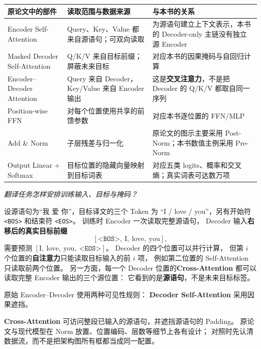 \begin{center}
\small
\renewcommand{\arraystretch}{1.18}
\begin{tabularx}{\linewidth}{@{}>{\raggedright\arraybackslash}p{35mm}>{\raggedright\arraybackslash}p{46mm}>{\raggedright\arraybackslash}X@{}}
\toprule
原论文中的部件 & 读取范围与数据来源 & 与本书的关系\\\midrule
Encoder Self-Attention &
Query、Key、Value 都来自源语句；可双向读取 &
为源语句建立上下文表示，本书的 Decoder-only 主链没有独立源 Encoder\\
Masked Decoder Self-Attention &
Q/K/V 来自目标前缀；屏蔽未来目标 &
对应本书的因果掩码与自回归计算\\
Encoder--Decoder Attention &
Query 来自 Decoder，Key/Value 来自 Encoder 输出 &
这是\textbf{交叉注意力}，不是把 Decoder 的 Q/K/V 都取自同一序列\\
Position-wise FFN &
对每个位置使用共享的前馈参数 &
对应本书逐位置的 FFN/MLP\\
Add \& Norm &
子层残差与归一化 &
原论文的图示主要采用 Post-Norm；本书数值主例采用 Pre-Norm\\
Output Linear + Softmax &
目标位置的隐藏向量映射到目标词表 &
对应五类 logits、概率和交叉熵；真实词表可达数万项\\
\bottomrule
\end{tabularx}
\end{center}

\begin{example}
\noindent\emph{翻译任务怎样安排训练输入、目标与掩码？}\par

设源语句为“我 爱 你”，目标译文的三个 Token 为
“I / love / you”，另有开始符 \texttt{<BOS>} 和结束符 \texttt{<EOS>}。
训练时 Encoder 一次读取完整源语句，
Decoder 输入\textbf{右移后的真实目标前缀}
\[
[\texttt{<BOS>},\ \text{I},\ \text{love},\ \text{you}],
\]
需要预测
$[\text{I},\ \text{love},\ \text{you},\ \texttt{<EOS>}]$。
Decoder 的四个位置可以并行计算，
但第 $i$ 个位置的\textbf{自注意力}只能读取目标输入的前 $i$ 项，
例如第二位置的 Self-Attention 只读取前两个位置。
另一方面，每一个 Decoder 位置的\textbf{Cross-Attention}
都可以读取完整 Encoder 输出的三个源位置：
它看到的是\textbf{源语句}，不是未来目标标签。
\end{example}

原始 Encoder--Decoder 使用两种可见性规则：
\textbf{Decoder Self-Attention} 采用因果遮挡。

\textbf{Cross-Attention} 可访问整段已输入的源语句，并遮挡源语句的 Padding。
原论文与现代模型在 Norm 放置、位置编码、层数等细节上各有设计；
对照时先认清数据流，而不是把架构图所有框都当成同一配置。

